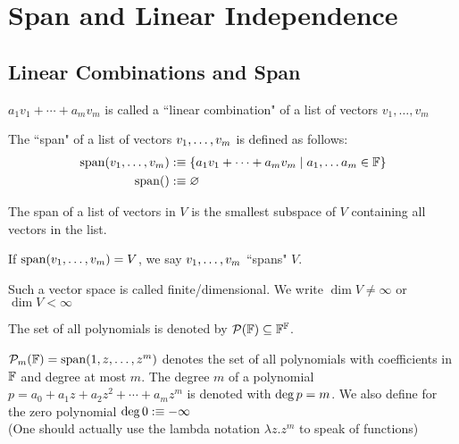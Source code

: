 \section{Span and Linear Independence}
\subsection{Linear Combinations and Span}

\setcounter{thm}{1}
\begin{mydef} 
  $a_1 v_1 + \cdots + a_m v_m$ is called a ``linear combination" of a list of vectors $v_1, \dots, v_m$
\end{mydef}

\setcounter{thm}{3}
\begin{mydef} 
	The ``span" of a list of vectors $v_1, \dots, v_m$ is defined as follows:
  \begin{equation}
    \begin{aligned}
      \operatorname{span} (v_1, \dots, v_m) &:\equiv \{a_1 v_1 + \cdots + a_m v_m \mid a_1, \dots a_m \in \mathbb{F} \}\\
      \operatorname{span} ( ) &:\equiv \varnothing
    \end{aligned}
  \end{equation}
\end{mydef}

\setcounter{thm}{5}
\begin{thm} 
  The  span of a list of vectors in $V$ is the smallest subspace of $V$ containing all vectors in the list.
\end{thm}

\begin{mydef} 
  If $\operatorname{span} (v_1, \dots, v_m) = V$, we say $v_1, \dots, v_m$ ``spans" $V$.
\end{mydef}

\setcounter{thm}{8}
\begin{mydef} 
  Such a vector space is called finite\-/dimensional. We write $\dim V \neq \infty$ or $\dim V < \infty$
\end{mydef}

\begin{mydef}
  The set of all polynomials is denoted by $\mathcal{P} (\mathbb{F}) \subseteq \mathbb{F}^{\mathbb{F}}$.
\end{mydef}
\begin{mydef}
  $\mathcal{P}_m (\mathbb{F} )=\operatorname{span} (1,z,\dots,z^m)$ denotes the set of all polynomials with coefficients in $\mathbb{F}$ and degree at most $m$. The degree $m$ of a polynomial $p=a_0+a_1z+a_2z^2+\cdots+a_mz^m$ is denoted with ${\operatorname{deg} \,} p=m$.
  We also define for the zero polynomial ${\operatorname{deg} \,} 0 : \equiv -\infty$ \\
  (One should actually use the lambda notation $\lambda z.z^m$ to speak of functions)
\end{mydef}

